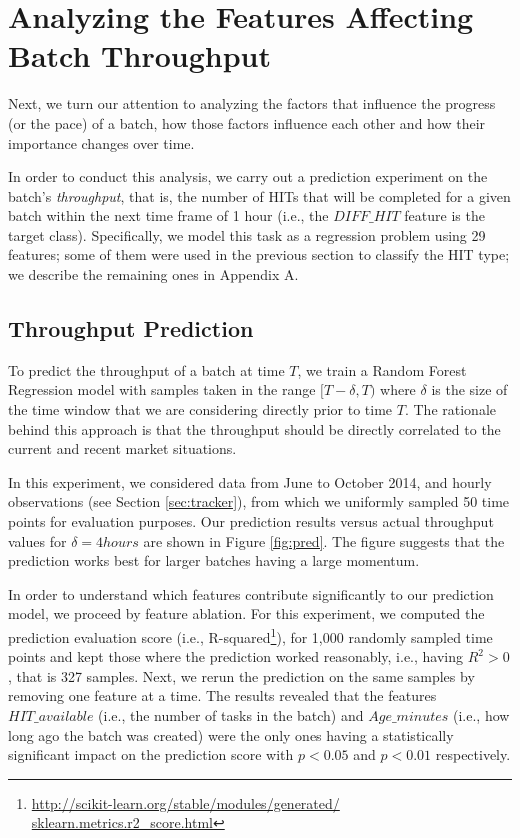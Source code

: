 \section{Analyzing the Features Affecting Batch Throughput}
\label{sec:throughput}
Next, we turn our attention to analyzing the factors that influence the progress (or the pace) of a batch, how those factors influence each other and how their importance changes over time. 

In order to conduct this analysis, we carry out a prediction experiment on the batch's \emph{throughput}, that is, the number of HITs that  will be completed for a given batch within the next time frame of 1 hour (i.e.,  the $DIFF\_HIT$ feature is the target class).
Specifically, we model this task as a regression problem using 29 features; some of them were used in the previous section to classify the HIT type; we describe the remaining ones in Appendix A.

\subsection{Throughput Prediction}

To predict the throughput of a batch at time $T$, we train a Random Forest Regression model with samples taken in the range $[T-\delta, T)$ where $\delta$ is the size of the time window that we are considering directly prior to time $T$. 
%
The rationale behind this approach is that the throughput should be directly correlated to the current and recent market situations. 

In this experiment, we considered  data from June to October 2014, and hourly observations (see Section \ref{sec:tracker}), from which we uniformly sampled 50 time points for evaluation purposes.
%
Our prediction results versus actual throughput values for $\delta=4hours$ are shown in Figure \ref{fig:pred}. 
%
The figure suggests that the prediction works best for larger batches having a large momentum.

In order to understand which features contribute significantly to our prediction model, we proceed by feature ablation. For this experiment, we computed the prediction evaluation score (i.e., R-squared\footnote{\url{http://scikit-learn.org/stable/modules/generated/ sklearn.metrics.r2_score.html}}), for 1,000 randomly sampled time points and kept those where the prediction worked reasonably, i.e., having $R^2>0$, that is 327 samples. Next, we rerun the prediction on the same samples by removing one feature at a time. The results revealed that the features $HIT\_available$ (i.e., the number of tasks in the batch) and $Age\_minutes$ (i.e., how long ago the batch was created) were the only ones having a statistically significant impact on the prediction score with $p < 0.05$ and $p < 0.01$ respectively. 

